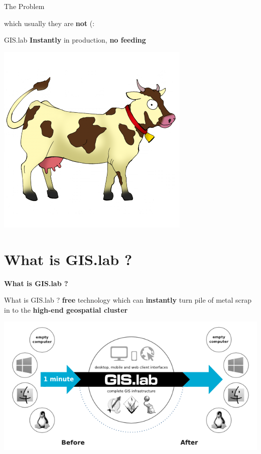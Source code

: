 \documentclass[12pt]{beamer}
\begin{document}
\begin{frame}{The Problem}
	\begin{center}
		which usually they are \textbf{not} (:
	\end{center}
\end{frame}

\begin{frame}{GIS.lab}
	\textbf{Instantly} in production, \textbf{no feeding}
	\begin{center}
		\includegraphics[keepaspectratio=true,height=0.6\textheight]{images/cow.png}
	\end{center}
\end{frame}


\section{What is GIS.lab ?}
\begin{frame}
	\begin{center}
		\LARGE\textbf{What is GIS.lab ?}
	\end{center}
\end{frame}

\begin{frame}{What is GIS.lab ?}
	\textbf{free} technology which can \textbf{instantly} turn pile of metal scrap in to the \textbf{high-end geospatial cluster}
	\begin{center}
		\includegraphics[keepaspectratio=true,height=0.5\textheight]{images/gislab-schema.png}
	\end{center}
\end{frame}
\end{document}

